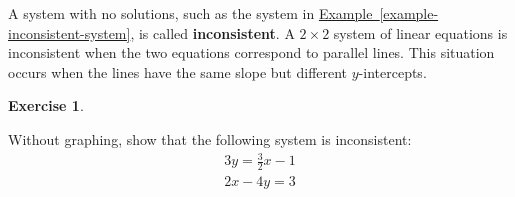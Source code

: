 \documentclass[10pt,]{book}
\newcommand{\terminology}[1]{\textbf{#1}}
\theoremstyle{plain}
\theoremstyle{definition}
\theoremstyle{definition}
\theoremstyle{definition}
\theoremstyle{definition}
\newtheorem{exercise}[theorem]{Exercise}
\numberwithin{equation}{section}
\begin{document}
	A system with no solutions, such as the system in \hyperref[example-inconsistent-system]{Example~\ref{example-inconsistent-system}}, is called \terminology{inconsistent}. A \(2\times 2\) system of linear equations is inconsistent when the two equations correspond to parallel lines. This situation occurs when the lines have the same slope but different \(y\)-intercepts.
%
\begin{exercise}\label{exercise-4}

		Without graphing, show that the following system is inconsistent:
		\begin{gather*}

				3y = \frac{3}{2}x − 1
			\\

				2x − 4y = 3
			
\end{gather*}
\end{exercise}
\par
\end{document}

